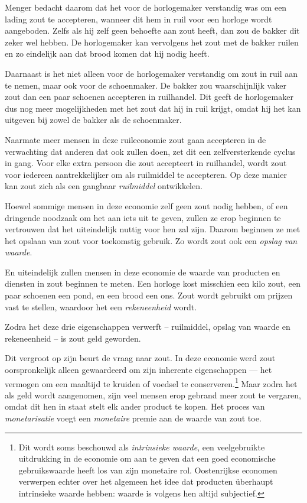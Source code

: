 \documentclass[
  a5paper,
  smalldemyvopaper,11pt,twoside,onecolumn,openright,extrafontsizes,
hidelinks]{memoir}
\begin{document}
Menger bedacht daarom dat het voor de horlogemaker verstandig was om een
lading zout te accepteren, wanneer dit hem in ruil voor een horloge
wordt aangeboden. Zelfs als hij zelf geen behoefte aan zout heeft, dan
zou de bakker dit zeker wel hebben. De horlogemaker kan vervolgens het
zout met de bakker ruilen en zo eindelijk aan dat brood komen dat hij
nodig heeft.

Daarnaast is het niet alleen voor de horlogemaker verstandig om zout in
ruil aan te nemen, maar ook voor de schoenmaker. De bakker zou
waarschijnlijk vaker zout dan een paar schoenen accepteren in
ruilhandel. Dit geeft de horlogemaker dus nog meer mogelijkheden met het
zout dat hij in ruil krijgt, omdat hij het kan uitgeven bij zowel de
bakker als de schoenmaker.

Naarmate meer mensen in deze ruileconomie zout gaan accepteren in de
verwachting dat anderen dat ook zullen doen, zet dit een
zelfversterkende cyclus in gang. Voor elke extra persoon die zout
accepteert in ruilhandel, wordt zout voor iedereen aantrekkelijker om
als ruilmiddel te accepteren. Op deze manier kan zout zich als een
gangbaar \emph{ruilmiddel} ontwikkelen.

Hoewel sommige mensen in deze economie zelf geen zout nodig hebben, of
een dringende noodzaak om het aan iets uit te geven, zullen ze erop
beginnen te vertrouwen dat het uiteindelijk nuttig voor hen zal zijn.
Daarom beginnen ze met het opslaan van zout voor toekomstig gebruik. Zo
wordt zout ook een \emph{opslag van waarde}.

En uiteindelijk zullen mensen in deze economie de waarde van producten
en diensten in zout beginnen te meten. Een horloge kost misschien een
kilo zout, een paar schoenen een pond, en een brood een ons. Zout wordt
gebruikt om prijzen vast te stellen, waardoor het een
\emph{rekeneenheid} wordt.

Zodra het deze drie eigenschappen verwerft -- ruilmiddel, opslag van
waarde en rekeneenheid -- is zout geld geworden.

Dit vergroot op zijn beurt de vraag naar zout. In deze economie werd
zout oorspronkelijk alleen gewaardeerd om zijn inherente eigenschappen
--- het vermogen om een maaltijd te kruiden of voedsel te
conserveren.\footnote{Dit wordt soms beschouwd als \emph{intrinsieke
  waarde}, een veelgebruikte uitdrukking in de economie om aan te geven
  dat een goed economische gebruikswaarde heeft los van zijn monetaire
  rol. Oostenrijkse economen verwerpen echter over het algemeen het idee
  dat producten überhaupt intrinsieke waarde hebben: waarde is volgens
  hen altijd subjectief.} Maar zodra het als geld wordt aangenomen, zijn
veel mensen erop gebrand meer zout te vergaren, omdat dit hen in staat
stelt elk ander product te kopen. Het proces van \emph{monetarisatie}
voegt een \emph{monetaire} premie aan de waarde van zout toe.
\end{document}
